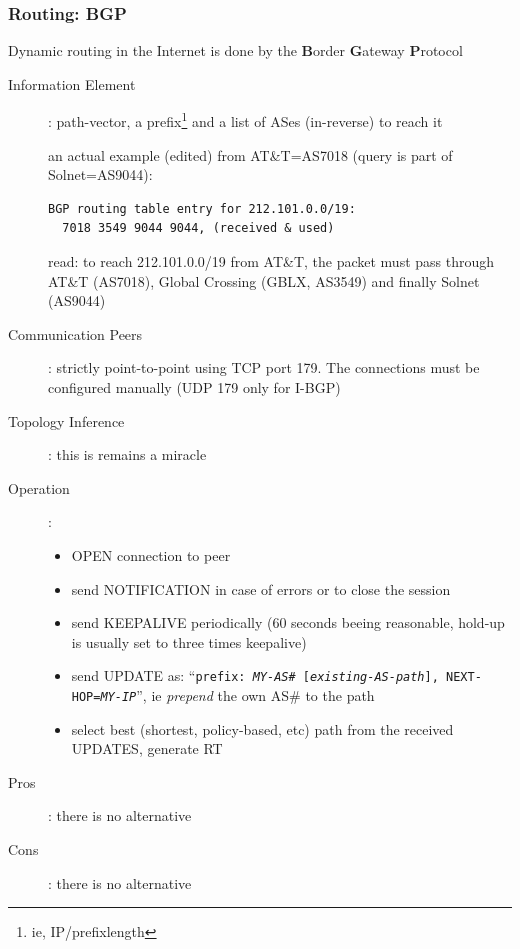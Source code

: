 \documentclass[ignorenonframetext]{beamer}
\begin{document}
\begin{frame}[fragile]
\frametitle{Routing: BGP}
Dynamic routing in the Internet is done by
the {\bf B}order {\bf G}ateway {\bf P}rotocol
\begin{description}
	\item[Information Element]: path-vector, a prefix\footnote{ie, IP/prefixlength} and a list
		of ASes (in-reverse) to reach it

		\begin{tiny}
			an actual example (edited) from AT\&T=AS7018 (query is part of Solnet=AS9044):
			\begin{verbatim}
BGP routing table entry for 212.101.0.0/19:
  7018 3549 9044 9044, (received & used)
			\end{verbatim}
			read: to reach 212.101.0.0/19 from AT\&T, the packet must pass through
			AT\&T (AS7018), Global Crossing (GBLX, AS3549) and finally Solnet (AS9044)
		\end{tiny}
	\item[Communication Peers]: strictly point-to-point using TCP port 179. The connections
		must be configured manually (UDP 179 only for I-BGP)
	\item[Topology Inference]: this is remains a miracle
	\item[Operation]: 
		\begin{tiny}
			\begin{itemize}
				\item OPEN connection to peer
				\item send NOTIFICATION in case of errors or to close the session
				\item send KEEPALIVE periodically (60 seconds beeing reasonable, hold-up is usually set to
					three times keepalive)
				\item send UPDATE as: ``{\tt prefix: \emph{MY-AS\#} [\emph{existing-AS-path}], NEXT-HOP=\emph{MY-IP}}'', ie \emph{prepend} the own AS\# to the path
				\item select best (shortest, policy-based, etc) path from the received UPDATES, generate RT
			\end{itemize}
		\end{tiny}
	\item[Pros]: there is no alternative
	\item[Cons]: there is no alternative
\end{description}
\end{frame}
\end{document}
